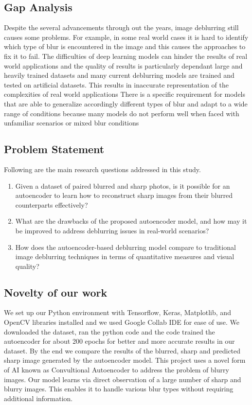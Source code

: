\documentclass[conference]{IEEEtran}
\begin{document}
\subsection{Gap Analysis}
Despite the several advancements through out the years, image deblurring still causes some problems. 
For example, in some real world cases it is hard to identify which type of blur is encountered in the image and this causes the approaches to fix it to fail.
The difficulties of deep learning models can hinder the results of real world applications and the quality of results is particularly dependant large and heavily trained datasets and many current deblurring models are trained and tested on artificial datasets.
This results in inaccurate representation of the complexities of real world applications
There is a specific requirement for models that are able to generalize accordingly different types of blur and adapt to a wide range of conditions because many models do not perform well when faced with unfamiliar scenarios or mixed blur conditions


\subsection{Problem Statement}
Following are the main research questions addressed in this study.

\begin{enumerate}
    \item Given a dataset of paired blurred and sharp photos, is it possible for an autoencoder to learn how to reconstruct sharp images from their blurred counterparts effectively?
    \item What are the drawbacks of the proposed autoencoder model, and how may it be improved to address deblurring issues in real-world scenarios?
    \item How does the autoencoder-based deblurring model compare to traditional image deblurring techniques in terms of quantitative measures and visual quality?
\end{enumerate}

\subsection{Novelty of our work}
We set up our Python environment with Tensorflow, Keras, Matplotlib, and OpenCV libraries installed and we used Google Collab IDE for ease of use.
We downloaded the dataset, ran the python code and the code trained the autoencoder for about 200 epochs for better and more accurate results in our dataset.
By the end we compare the results of the blurred,
sharp and predicted sharp image generated by the autoencoder model.
This project uses a novel form of AI known as Convultional Autoencoder to address the problem of blurry images. 
Our model learns via direct observation of a large number of sharp and blurry images. This enables it to handle various blur types without requiring additional information.
\end{document}
